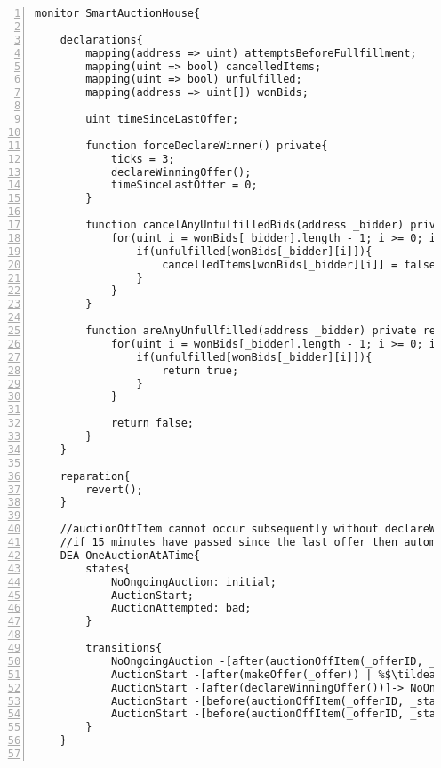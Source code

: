 \documentclass{article}
\newcommand{\tildearrow}{{\raise.37ex\hbox{$\scriptstyle\mathtt{\sim}$}}\hspace{-0.08cm}>\xspace}
\begin{document}
\small\begin{lstlisting}[language=DEA,basicstyle=\scriptsize,numbers=left,numbersep=2pt,xleftmargin=0.3cm,escapechar=\%,label={dea:auctionhouse},caption={A monitor that checks that only one auction is ongoing at any point in time and setting time limits on when a winning bid needs to be fulfilled.}]
monitor SmartAuctionHouse{

    declarations{
        mapping(address => uint) attemptsBeforeFullfillment;
        mapping(uint => bool) cancelledItems; 
        mapping(uint => bool) unfulfilled; 
        mapping(address => uint[]) wonBids; 

        uint timeSinceLastOffer;

        function forceDeclareWinner() private{
            ticks = 3; 
            declareWinningOffer(); 
            timeSinceLastOffer = 0;
        }
        
        function cancelAnyUnfulfilledBids(address _bidder) private{
            for(uint i = wonBids[_bidder].length - 1; i >= 0; i--){
                if(unfulfilled[wonBids[_bidder][i]]){
                    cancelledItems[wonBids[_bidder][i]] = false;
                }
            }
        }

        function areAnyUnfullfilled(address _bidder) private returns(bool){
            for(uint i = wonBids[_bidder].length - 1; i >= 0; i--){
                if(unfulfilled[wonBids[_bidder][i]]){
                    return true;
                }
            }

            return false;
        }
    }

    reparation{
        revert();
    }

    //auctionOffItem cannot occur subsequently without declareWinningOffer in between
    //if 15 minutes have passed since the last offer then automatically declare the winner
    DEA OneAuctionAtATime{
        states{
            NoOngoingAuction: initial;
            AuctionStart;
            AuctionAttempted: bad;
        }

        transitions{
            NoOngoingAuction -[after(auctionOffItem(_offerID, _startingOffer))]-> AuctionStart;
            AuctionStart -[after(makeOffer(_offer)) | %$\tildearrow$% timeSinceLastOffer = now;]-> AuctionStart;
            AuctionStart -[after(declareWinningOffer())]-> NoOngoingAuction;
            AuctionStart -[before(auctionOffItem(_offerID, _startingOffer)) | now - timeSinceLastOffer < 15 minutes]-> AuctionAttempted;
            AuctionStart -[before(auctionOffItem(_offerID, _startingOffer)) | now - timeSinceLastOffer >= 15 minutes %$\tildearrow$% forceDeclareWinner();]-> AuctionStart;
        }
    }


\end{lstlisting}
\end{document}
